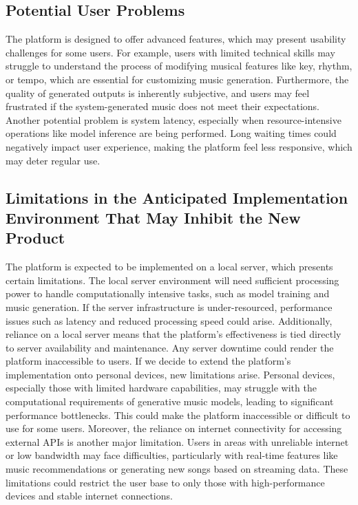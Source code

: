 \documentclass[12pt]{article}
\begin{document}
\subsection{Potential User Problems}

The platform is designed to offer advanced features, which may present usability challenges for some users. For example, users with limited technical skills may struggle to understand the process of modifying musical features like key, rhythm, or tempo, which are essential for customizing music generation. Furthermore, the quality of generated outputs is inherently subjective, and users may feel frustrated if the system-generated music does not meet their expectations. Another potential problem is system latency, especially when resource-intensive operations like model inference are being performed. Long waiting times could negatively impact user experience, making the platform feel less responsive, which may deter regular use.

\subsection{Limitations in the Anticipated Implementation Environment That May Inhibit the New Product}

The platform is expected to be implemented on a local server, which presents certain limitations. The local server environment will need sufficient processing power to handle computationally intensive tasks, such as model training and music generation. If the server infrastructure is under-resourced, performance issues such as latency and reduced processing speed could arise. Additionally, reliance on a local server means that the platform's effectiveness is tied directly to server availability and maintenance. Any server downtime could render the platform inaccessible to users. If we decide to extend the platform's implementation onto personal devices, new limitations arise. Personal devices, especially those with limited hardware capabilities, may struggle with the computational requirements of generative music models, leading to significant performance bottlenecks. This could make the platform inaccessible or difficult to use for some users. Moreover, the reliance on internet connectivity for accessing external APIs is another major limitation. Users in areas with unreliable internet or low bandwidth may face difficulties, particularly with real-time features like music recommendations or generating new songs based on streaming data. These limitations could restrict the user base to only those with high-performance devices and stable internet connections.
\end{document}
